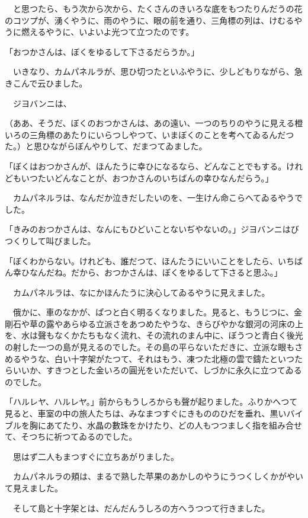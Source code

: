 \documentclass[tate,paper=b6j,jafontsize=9pt]{jlreq}
\begin{document}
　と思つたら、もう次から次から、たくさんのきいろな底をもつたりんだうの花のコツプが、湧くやうに、雨のやうに、眼の前を通り、三角標の列は、けむるやうに燃えるやうに、いよいよ光つて立つたのです。



「おつかさんは、ぼくをゆるして下さるだらうか。」

　いきなり、カムパネルラが、思ひ切つたといふやうに、少しどもりながら、急きこんで云ひました。

　ジヨバンニは、

（ああ、そうだ、ぼくのおつかさんは、あの遠い、一つのちりのやうに見える橙いろの三角標のあたりにいらつしやつて、いまぼくのことを考へてゐるんだつた。）と思ひながらぼんやりして、だまつてゐました。

「ぼくはおつかさんが、ほんたうに幸ひになるなら、どんなことでもする。けれどもいつたいどんなことが、おつかさんのいちばんの幸ひなんだらう。」

　カムパネルラは、なんだか泣きだしたいのを、一生けん命こらへてゐるやうでした。

「きみのおつかさんは、なんにもひどいことないぢやないの。」ジヨバンニはびつくりして叫びました。

「ぼくわからない。けれども、誰だつて、ほんたうにいいことをしたら、いちばん幸ひなんだね。だから、おつかさんは、ぼくをゆるして下さると思ふ。」

　カムパネルラは、なにかほんたうに決心してゐるやうに見えました。

　俄かに、車のなかが、ぱつと白く明るくなりました。見ると、もうじつに、金剛石や草の露やあらゆる立派さをあつめたやうな、きらびやかな銀河の河床の上を、水は聲もなくかたちもなく流れ、その流れのまん中に、ぼうつと青白く後光の射した一つの島が見えるのでした。その島の平らないただきに、立派な眼もさめるやうな、白い十字架がたつて、それはもう、凍つた北極の雲で鑄たといつたらいいか、すきつとした金いろの圓光をいただいて、しづかに永久に立つてゐるのでした。

「ハルレヤ、ハルレヤ。」前からもうしろからも聲が起りました。ふりかへつて見ると、車室の中の旅人たちは、みなまつすぐにきもののひだを垂れ、黒いバイブルを胸にあてたり、水晶の數珠をかけたり、どの人もつつましく指を組み合せて、そつちに祈つてゐるのでした。

　思はず二人もまつすぐに立ちあがりました。

　カムパネルラの頬は、まるで熟した苹果のあかしのやうにうつくしくかがやいて見えました。

　そして島と十字架とは、だんだんうしろの方へうつつて行きました。
\end{document}
